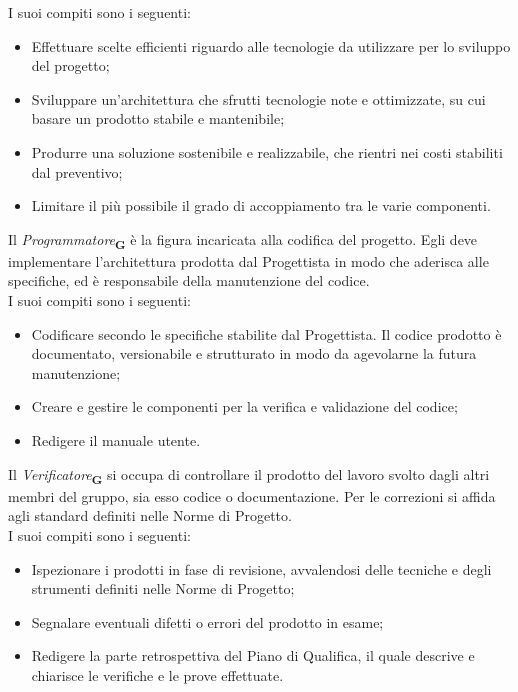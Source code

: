 I suoi compiti sono i seguenti:
\begin {itemize}
\item Effettuare scelte efficienti riguardo alle tecnologie da utilizzare per lo sviluppo del progetto;
\item Sviluppare un'architettura che sfrutti tecnologie note e ottimizzate, su cui basare un prodotto stabile e mantenibile;
\item Produrre una soluzione sostenibile e realizzabile, che rientri nei costi stabiliti dal preventivo;
\item Limitare il più possibile il grado di accoppiamento tra le varie componenti.
\end {itemize}
Il \textit{Programmatore}\textsubscript{\textbf{G}} è la figura incaricata alla codifica del progetto. Egli deve implementare l’architettura prodotta dal Progettista in modo che aderisca alle specifiche, ed è responsabile della manutenzione del codice.\\
I suoi compiti sono i seguenti:
\begin {itemize}
\item Codificare secondo le specifiche stabilite dal Progettista. Il codice prodotto è documentato, versionabile e strutturato in modo da agevolarne la futura manutenzione;
\item Creare e gestire le componenti per la verifica e validazione del codice;
\item Redigere il manuale utente.
\end {itemize}
Il \textit{Verificatore}\textsubscript{\textbf{G}} si occupa di controllare il prodotto del lavoro svolto dagli altri membri del gruppo, sia esso codice o documentazione. Per le correzioni si affida agli standard definiti nelle Norme di Progetto.\\
I suoi compiti sono i seguenti:
\begin {itemize}
\item Ispezionare i prodotti in fase di revisione, avvalendosi delle tecniche e degli strumenti definiti nelle Norme di Progetto;
\item Segnalare eventuali difetti o errori del prodotto in esame;
\item Redigere la parte retrospettiva del Piano di Qualifica, il quale descrive e chiarisce le verifiche e le prove effettuate.
\end {itemize}
